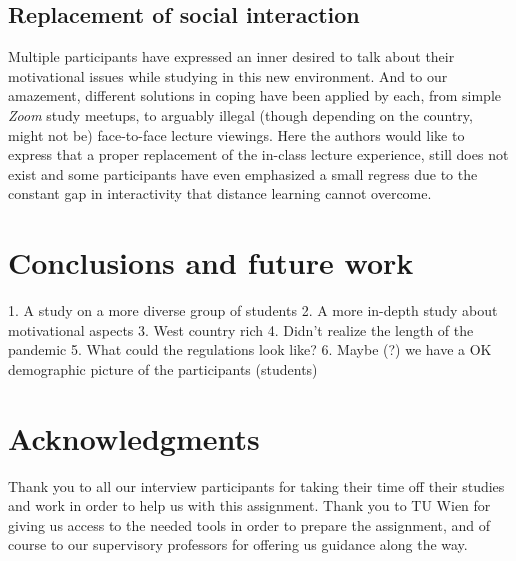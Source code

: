 \documentclass{sigchi}
\begin{document}
\subsection{Replacement of social interaction}

Multiple participants have expressed an inner desired to talk about their motivational issues while studying in this new environment. And to our amazement, different solutions in coping have been applied by each, from simple \emph{Zoom} study meetups, to arguably illegal (though depending on the country, might not be) face-to-face lecture viewings. Here the authors would like to express that a proper replacement of the in-class lecture experience, still does not exist and some participants have even emphasized a small regress due to the constant gap in interactivity that distance learning cannot overcome.

\section{Conclusions and future work}

1. A study on a more diverse group of students
2. A more in-depth study about motivational aspects
3. West country rich 
4. Didn’t realize the length of the pandemic
5. What could the regulations look like?
6. Maybe (?) we have a OK demographic picture of the participants (students) \\





\section{Acknowledgments}
Thank you to all our interview participants for taking their time off their studies and work in order to help us with this assignment. Thank you to TU Wien for giving us access to the needed tools in order to prepare the assignment, and of course to our supervisory professors for offering us guidance along the way.



\end{document}
